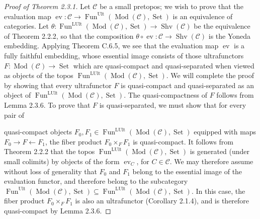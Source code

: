 \documentclass[11pt]{article}
\theoremstyle{plain}
\theoremstyle{remark}
\newcommand{\Mod}{\operatorname{Mod}}
\newcommand{\Set}{\operatorname{Set}}
\newcommand{\Shv}{\operatorname{Shv}}
\newcommand{\Fun}{\operatorname{Fun}}
\newcommand{\ev}{\operatorname{ev}}
\newcommand{\Ult}{\mathrm{Ult}}
\newcommand{\LUlt}{\mathrm{LUlt}}
\begin{document}
\begin{proof}[Proof of Theorem 2.3.1]
Let $\mathcal{C}$ be a small pretopos; we wish to prove that the evaluation map
$\ev : \mathcal{C} \to \Fun^{\Ult}(\Mod(\mathcal{C}), \Set)$ is an equivalence of categories.
Let $\theta : \Fun^{\LUlt}(\Mod(\mathcal{C}), \Set) \to \Shv(\mathcal{C})$ be the equivalence
of Theorem 2.2.2, so that the composition $\theta \circ \ev : \mathcal{C} \to \Shv(\mathcal{C})$
is the Yoneda embedding. Applying Theorem C.6.5, we see that the evaluation map $\ev$ is a
fully faithful embedding, whose essential image consists of those ultrafunctors
$F : \Mod(\mathcal{C}) \to \Set$ which are quasi-compact and quasi-separated when viewed as
objects of the topos $\Fun^{\LUlt}(\Mod(\mathcal{C}), \Set)$. We will complete the proof by
showing that every ultrafunctor $F$ is quasi-compact and quasi-separated as an object of
$\Fun^{\LUlt}(\Mod(\mathcal{C}), \Set)$. The quasi-compactness of $F$ follows from
Lemma 2.3.6. To prove that $F$ is quasi-separated, we must show that for every pair of


quasi-compact objects $F_0, F_1 \in \Fun^{\LUlt}(\Mod(\mathcal{C}), \Set)$ equipped with maps
$F_0 \to F \leftarrow F_1$, the fiber product $F_0 \times_F F_1$ is quasi-compact. It follows
from Theorem 2.2.2 that the topos $\Fun^{\LUlt}(\Mod(\mathcal{C}), \Set)$ is generated (under
small colimits) by objects of the form $\ev_C$, for $C \in \mathcal{C}$. We may therefore
assume without loss of generality that $F_0$ and $F_1$ belong to the essential image of the
evaluation functor, and therefore belong to the subcategory
$\Fun^{\Ult}(\Mod(\mathcal{C}), \Set) \subseteq \Fun^{\LUlt}(\Mod(\mathcal{C}), \Set)$. In this
case, the fiber product $F_0 \times_F F_1$ is also an ultrafunctor (Corollary 2.1.4), and is
therefore quasi-compact by Lemma 2.3.6.
\end{proof}
\end{document}
